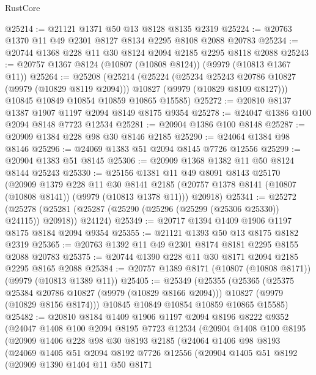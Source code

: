 \begin{lexlean}{RustCore}
\begin{coremodule}
@25214 := @21121 @1371 @50 @13 @8128 @8135 @2319
@25224 := @20763 @1370 @11 @49 @2301 @8127 @8134 @2295 @8108 @2088 @20783
@25234 := @20744 @1368 @228 @11 @30 @8124 @2094 @2185 @2295 @8118 @2088
@25243 := @20757 @1367 @8124 (@10807 (@10808 @8124)) (@9979 (@10813 @1367 @11))
@25264 := @25208
    (@25214
      (@25224
        (@25234 @25243 @20786 @10827 (@9979 (@10829 @8119 @2094)))
        @10827
        (@9979 (@10829 @8109 @8127)))
      @10845
      @10849
      @10854
      @10859
      @10865
      @15585)
@25272 := @20810 @8137 @1387 @1907 @1197 @2094 @8149 @8175 @9354
@25278 := @24047 @1386 @100 @2094 @8148 @7723 @12534
@25281 := @20904 @1386 @100 @8148
@25287 := @20909 @1384 @228 @98 @30 @8146 @2185
@25290 := @24064 @1384 @98 @8146
@25296 := @24069 @1383 @51 @2094 @8145 @7726 @12556
@25299 := @20904 @1383 @51 @8145
@25306 := @20909 @1368 @1382 @11 @50 @8124 @8144 @25243
@25330 := @25156
    @1381
    @11
    @49
    @8091
    @8143
    @25170
    (@20909
      @1379
      @228
      @11
      @30
      @8141
      @2185
      (@20757 @1378 @8141 (@10807 (@10808 @8141)) (@9979 (@10813 @1378 @11)))
      @20918)
@25341 := @25272
    (@25278 (@25281 (@25287 (@25290 (@25296 (@25299 (@25306 @25330)) @24115)) @20918)) @24124)
@25349 := @20717 @1394 @1409 @1906 @1197 @8175 @8184 @2094 @9354
@25355 := @21121 @1393 @50 @13 @8175 @8182 @2319
@25365 := @20763 @1392 @11 @49 @2301 @8174 @8181 @2295 @8155 @2088 @20783
@25375 := @20744 @1390 @228 @11 @30 @8171 @2094 @2185 @2295 @8165 @2088
@25384 := @20757 @1389 @8171 (@10807 (@10808 @8171)) (@9979 (@10813 @1389 @11))
@25405 := @25349
    (@25355
      (@25365
        (@25375 @25384 @20786 @10827 (@9979 (@10829 @8166 @2094)))
        @10827
        (@9979 (@10829 @8156 @8174)))
      @10845
      @10849
      @10854
      @10859
      @10865
      @15585)
@25482 := @20810
    @8184
    @1409
    @1906
    @1197
    @2094
    @8196
    @8222
    @9352
    (@24047
      @1408
      @100
      @2094
      @8195
      @7723
      @12534
      (@20904
        @1408
        @100
        @8195
        (@20909
          @1406
          @228
          @98
          @30
          @8193
          @2185
          (@24064
            @1406
            @98
            @8193
            (@24069
              @1405
              @51
              @2094
              @8192
              @7726
              @12556
              (@20904
                @1405
                @51
                @8192
                (@20909
                  @1390
                  @1404
                  @11
                  @50
                  @8171

\end{coremodule}
\end{lexlean}
